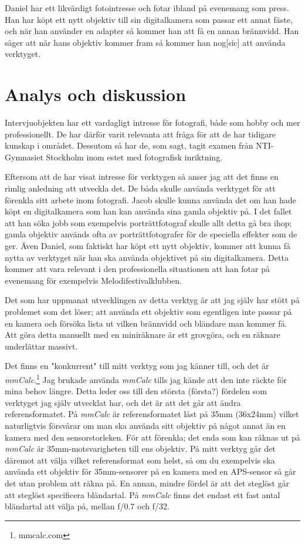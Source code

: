 \documentclass[11pt]{article}
\begin{document}
Daniel har ett likvärdigt fotointresse och fotar ibland på evenemang som press.
Han har köpt ett nytt objektiv till sin digitalkamera som passar ett annat
fäste, och när han använder en adapter så kommer han att få en annan brännvidd.
Han säger att när hans objektiv kommer fram så kommer han nog[sic] att använda
verktyget. \par
\fussy

\section{Analys och diskussion}
\sloppy
Intervjuobjekten har ett vardagligt intresse för fotografi, både som hobby och
mer professionellt. De har därför varit relevanta att fråga för att de har
tidigare kunskap i området. Dessutom så har de, som sagt, tagit examen från
NTI-Gymnasiet Stockholm inom estet med fotografisk inriktning. \par

Eftersom att de har visat intresse för verktygen så anser jag att det finns en
rimlig anledning att utveckla det. De båda skulle använda verktyget för att
förenkla sitt arbete inom fotografi. Jacob skulle kunna använda det om han hade
köpt en digitalkamera som han kan använda sina gamla objektiv på. I det fallet
att han söka jobb som exempelvis porträttfotograf skulle allt detta gå bra ihop;
gamla objektiv används ofta av porträttfotografer för de speciella effekter som
de ger. Även Daniel, som faktiskt har köpt ett nytt objektiv, kommer att kunna
få nytta av verktyget när han ska använda objektivet på sin digitalkamera. Detta
kommer att vara relevant i den professionella situationen att han fotar på
evenemang för exempelvis Melodifestivalklubben.\par

Det som har uppmanat utvecklingen av detta verktyg är att jag själv har stött på
problemet som det löser; att använda ett objektiv som egentligen inte passar på
en kamera och försöka lista ut vilken brännvidd och bländare man kommer få.
Att göra detta manuellt med en miniräknare är ett grovgöra, och en räknare
underlättar massivt.\par

Det finns en "konkurrent" till mitt verktyg som jag känner till, och det är
\emph{mmCalc}.\footnote{mmcalc.com} Jag brukade använda \emph{mmCalc} tills
jag kände att den inte räckte för mina behov längre. Detta leder oss till den
största {(första?)} fördelen som verktyget jag själv utvecklat har, och det
är att det går att ändra referensformatet. På \emph{mmCalc} är
referensformatet låst på 35mm (36x24mm) vilket naturligtvis försvårar om man
ska använda sitt objektiv på något annat än en kamera med den sensorstorleken.
För att förenkla; det enda som kan räknas ut på \emph{mmCalc} är
35mm-motsvarigheten till ens objektiv. På mitt verktyg går det däremot att välja
vilket referensformat som helst, så om du exempelvis ska använda ett objektiv
för 35mm-sensorer på en kamera med en APS-sensor så går det utan problem att
räkna på. En annan, mindre fördel är att det steglöst går att steglöst
specificera bländartal. På \emph{mmCalc} finns det endast ett fast antal
bländartal att välja på, mellan f/0.7 och f/32.\par
\end{document}
